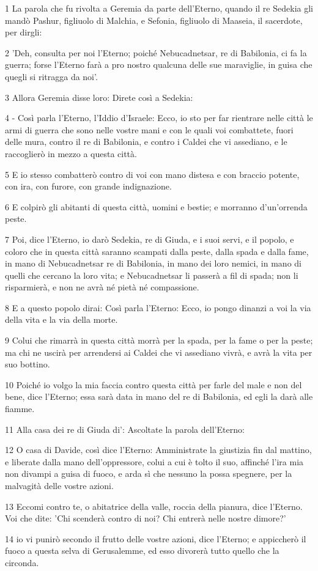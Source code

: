 \par 1 La parola che fu rivolta a Geremia da parte dell'Eterno, quando il re Sedekia gli mandò Pashur, figliuolo di Malchia, e Sefonia, figliuolo di Maaseia, il sacerdote, per dirgli:
\par 2 'Deh, consulta per noi l'Eterno; poiché Nebucadnetsar, re di Babilonia, ci fa la guerra; forse l'Eterno farà a pro nostro qualcuna delle sue maraviglie, in guisa che quegli si ritragga da noi'.
\par 3 Allora Geremia disse loro: Direte così a Sedekia:
\par 4 - Così parla l'Eterno, l'Iddio d'Israele: Ecco, io sto per far rientrare nelle città le armi di guerra che sono nelle vostre mani e con le quali voi combattete, fuori delle mura, contro il re di Babilonia, e contro i Caldei che vi assediano, e le raccoglierò in mezzo a questa città.
\par 5 E io stesso combatterò contro di voi con mano distesa e con braccio potente, con ira, con furore, con grande indignazione.
\par 6 E colpirò gli abitanti di questa città, uomini e bestie; e morranno d'un'orrenda peste.
\par 7 Poi, dice l'Eterno, io darò Sedekia, re di Giuda, e i suoi servi, e il popolo, e coloro che in questa città saranno scampati dalla peste, dalla spada e dalla fame, in mano di Nebucadnetsar re di Babilonia, in mano dei loro nemici, in mano di quelli che cercano la loro vita; e Nebucadnetsar li passerà a fil di spada; non li risparmierà, e non ne avrà né pietà né compassione.
\par 8 E a questo popolo dirai: Così parla l'Eterno: Ecco, io pongo dinanzi a voi la via della vita e la via della morte.
\par 9 Colui che rimarrà in questa città morrà per la spada, per la fame o per la peste; ma chi ne uscirà per arrendersi ai Caldei che vi assediano vivrà, e avrà la vita per suo bottino.
\par 10 Poiché io volgo la mia faccia contro questa città per farle del male e non del bene, dice l'Eterno; essa sarà data in mano del re di Babilonia, ed egli la darà alle fiamme.
\par 11 Alla casa dei re di Giuda di': Ascoltate la parola dell'Eterno:
\par 12 O casa di Davide, così dice l'Eterno: Amministrate la giustizia fin dal mattino, e liberate dalla mano dell'oppressore, colui a cui è tolto il suo, affinché l'ira mia non divampi a guisa di fuoco, e arda sì che nessuno la possa spegnere, per la malvagità delle vostre azioni.
\par 13 Eccomi contro te, o abitatrice della valle, roccia della pianura, dice l'Eterno. Voi che dite: 'Chi scenderà contro di noi? Chi entrerà nelle nostre dimore?'
\par 14 io vi punirò secondo il frutto delle vostre azioni, dice l'Eterno; e appiccherò il fuoco a questa selva di Gerusalemme, ed esso divorerà tutto quello che la circonda.

